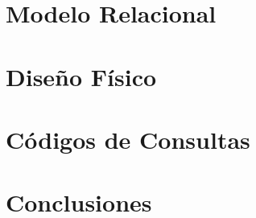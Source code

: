 \documentclass[11pt, a4paper]{article}
\begin{document}

\maketitle
\newpage

\tableofcontents

\newpage


\newpage


\newpage
\section{Modelo Relacional}



\section{Diseño Físico}

\section{Códigos de Consultas}

\section{Conclusiones}
\end{document}
